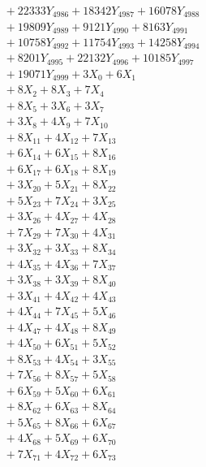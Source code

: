 \documentclass[a4paper,10pt]{article}
\begin{document}
{\begin{align}
&\;  + 22333 Y_{4986} + 18342 Y_{4987} + 16078 Y_{4988} \\[0.3ex]
&\;  + 19809 Y_{4989} + 9121 Y_{4990} + 8163 Y_{4991} \\[0.3ex]
&\;  + 10758 Y_{4992} + 11754 Y_{4993} + 14258 Y_{4994} \\[0.3ex]
&\;  + 8201 Y_{4995} + 22132 Y_{4996} + 10185 Y_{4997} \\[0.3ex]
&\;  + 19071 Y_{4999} + 3 X_{0} + 6 X_{1} \\[0.3ex]
&\;  + 8 X_{2} + 8 X_{3} + 7 X_{4} \\[0.3ex]
&\;  + 8 X_{5} + 3 X_{6} + 3 X_{7} \\[0.3ex]
&\;  + 3 X_{8} + 4 X_{9} + 7 X_{10} \\[0.5ex]\allowbreak
&\;  + 8 X_{11} + 4 X_{12} + 7 X_{13} \\[0.3ex]
&\;  + 6 X_{14} + 6 X_{15} + 8 X_{16} \\[0.3ex]
&\;  + 6 X_{17} + 6 X_{18} + 8 X_{19} \\[0.3ex]
&\;  + 3 X_{20} + 5 X_{21} + 8 X_{22} \\[0.3ex]
&\;  + 5 X_{23} + 7 X_{24} + 3 X_{25} \\[0.3ex]
&\;  + 3 X_{26} + 4 X_{27} + 4 X_{28} \\[0.3ex]
&\;  + 7 X_{29} + 7 X_{30} + 4 X_{31} \\[0.3ex]
&\;  + 3 X_{32} + 3 X_{33} + 8 X_{34} \\[0.3ex]
&\;  + 4 X_{35} + 4 X_{36} + 7 X_{37} \\[0.3ex]
&\;  + 3 X_{38} + 3 X_{39} + 8 X_{40} \\[0.5ex]\allowbreak
&\;  + 3 X_{41} + 4 X_{42} + 4 X_{43} \\[0.3ex]
&\;  + 4 X_{44} + 7 X_{45} + 5 X_{46} \\[0.3ex]
&\;  + 4 X_{47} + 4 X_{48} + 8 X_{49} \\[0.3ex]
&\;  + 4 X_{50} + 6 X_{51} + 5 X_{52} \\[0.3ex]
&\;  + 8 X_{53} + 4 X_{54} + 3 X_{55} \\[0.3ex]
&\;  + 7 X_{56} + 8 X_{57} + 5 X_{58} \\[0.3ex]
&\;  + 6 X_{59} + 5 X_{60} + 6 X_{61} \\[0.3ex]
&\;  + 8 X_{62} + 6 X_{63} + 8 X_{64} \\[0.3ex]
&\;  + 5 X_{65} + 8 X_{66} + 6 X_{67} \\[0.3ex]
&\;  + 4 X_{68} + 5 X_{69} + 6 X_{70} \\[0.5ex]\allowbreak
&\;  + 7 X_{71} + 4 X_{72} + 6 X_{73} \\[0.3ex]

\end{align}}
\end{document}
